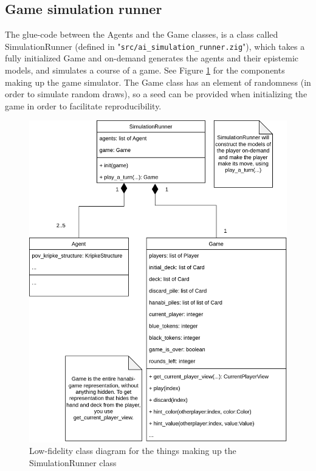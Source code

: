 \subsection{Game simulation runner}
The glue-code between the Agents and the Game classes, is a class called SimulationRunner (defined in "{\tt src/ai\_simulation\_runner.zig}"), which takes a fully initialized Game and on-demand generates the agents and their epistemic models, and simulates a course of a game. See Figure \ref{fig:SimulationRunner-class-diagram} for the components making up the game simulator. The Game class has an element of randomness (in order to simulate random draws), so a seed can be provided when initializing the game in order to facilitate reproducibility.

\begin{figure}
	\includegraphics[width=13cm]{images/simulationrunner-uml-class-diagram.png}
	\caption{Low-fidelity class diagram for the things making up the SimulationRunner class}
	\label{fig:SimulationRunner-class-diagram}
\end{figure}
